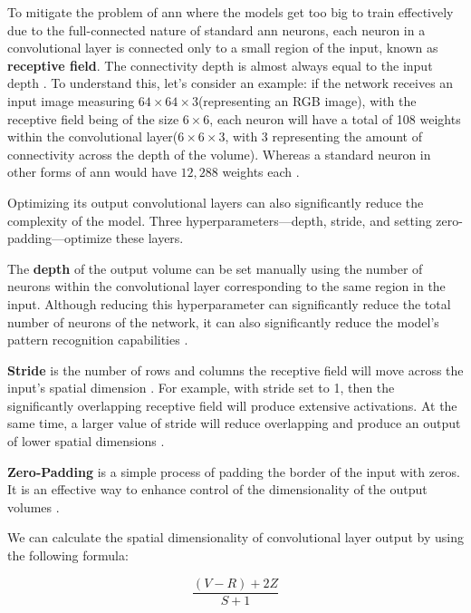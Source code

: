 To mitigate the problem of \gls{ann} where the models get too big to train effectively due to the full-connected nature of standard \gls{ann} neurons, each neuron in a convolutional layer is connected only to a small region of the input, known as \textbf{receptive field}. The connectivity depth is almost always equal to the input depth \cite{oshea2015introductionconvolutionalneuralnetworks}. To understand this, let's consider an example: if the network receives an input image measuring $64\times64\times3$(representing an RGB image), with the receptive field being of the size $6\times6$, each neuron will have a total of 108 weights within the convolutional layer($6\times6\times3$, with 3 representing the amount of connectivity across the depth of the volume). Whereas a standard neuron in other forms of \gls{ann} would have $12,288$ weights each \cite{oshea2015introductionconvolutionalneuralnetworks}.

Optimizing its output convolutional layers can also significantly reduce the complexity of the model. Three hyperparameters—depth, stride, and setting zero-padding—optimize these layers.

The \textbf{depth} of the output volume can be set manually using the number of neurons within the convolutional layer corresponding to the same region in the input. Although reducing this hyperparameter can significantly reduce the total number of neurons of the network, it can also significantly reduce the model's pattern recognition capabilities \cite{oshea2015introductionconvolutionalneuralnetworks}.


\textbf{Stride} is the number of rows and columns the receptive field will move across the input's spatial dimension \cite{Zhao2024}. For example, with stride set to 1, then the significantly overlapping receptive field will produce extensive activations. At the same time, a larger value of stride will reduce overlapping and produce an output of lower spatial dimensions \cite{oshea2015introductionconvolutionalneuralnetworks}.

\textbf{Zero-Padding} is a simple process of padding the border of the input with zeros. It is an effective way to enhance control of the dimensionality of the output volumes \cite{oshea2015introductionconvolutionalneuralnetworks}.

We can calculate the spatial dimensionality of convolutional layer output by using the following formula: 

\[
    \frac{(V - R) + 2Z}{S + 1}
\]

